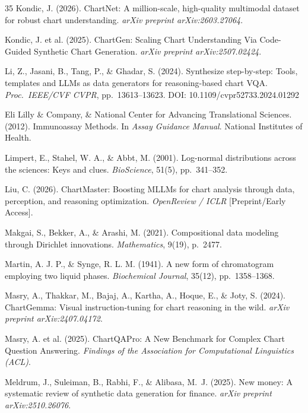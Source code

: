 \documentclass[11pt,twocolumn]{article}
\begin{document}
\begin{thebibliography}{35}
Kondic, J. (2026).
\newblock ChartNet: A million-scale, high-quality multimodal dataset for robust chart understanding.
\newblock \emph{arXiv preprint arXiv:2603.27064}.

Kondic, J. et al. (2025).
\newblock ChartGen: Scaling Chart Understanding Via Code-Guided Synthetic Chart Generation.
\newblock \emph{arXiv preprint arXiv:2507.02424}.

Li, Z., Jasani, B., Tang, P., \& Ghadar, S. (2024).
\newblock Synthesize step-by-step: Tools, templates and LLMs as data generators for reasoning-based chart VQA.
\newblock \emph{Proc.\ IEEE/CVF CVPR}, pp.\ 13613--13623.
\newblock DOI: 10.1109/cvpr52733.2024.01292

Eli Lilly \& Company, \& National Center for Advancing Translational Sciences. (2012).
\newblock Immunoassay Methods.
\newblock In \emph{Assay Guidance Manual}. National Institutes of Health.

Limpert, E., Stahel, W. A., \& Abbt, M. (2001).
\newblock Log-normal distributions across the sciences: Keys and clues.
\newblock \emph{BioScience}, 51(5), pp.\ 341--352.

Liu, C. (2026).
\newblock ChartMaster: Boosting MLLMs for chart analysis through data, perception, and reasoning optimization.
\newblock \emph{OpenReview / ICLR} [Preprint/Early Access].

Makgai, S., Bekker, A., \& Arashi, M. (2021).
\newblock Compositional data modeling through Dirichlet innovations.
\newblock \emph{Mathematics}, 9(19), p.\ 2477.

Martin, A. J. P., \& Synge, R. L. M. (1941).
\newblock A new form of chromatogram employing two liquid phases.
\newblock \emph{Biochemical Journal}, 35(12), pp.\ 1358--1368.

Masry, A., Thakkar, M., Bajaj, A., Kartha, A., Hoque, E., \& Joty, S. (2024).
\newblock ChartGemma: Visual instruction-tuning for chart reasoning in the wild.
\newblock \emph{arXiv preprint arXiv:2407.04172}.

Masry, A. et al. (2025).
\newblock ChartQAPro: A New Benchmark for Complex Chart Question Answering.
\newblock \emph{Findings of the Association for Computational Linguistics (ACL)}.

Meldrum, J., Suleiman, B., Rabhi, F., \& Alibasa, M.~J. (2025).
\newblock New money: A systematic review of synthetic data generation for finance.
\newblock \emph{arXiv preprint arXiv:2510.26076}.


\end{thebibliography}
\end{document}
